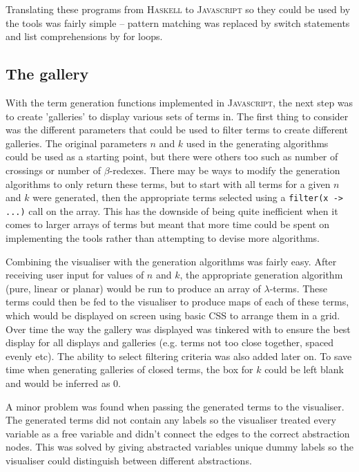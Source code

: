 \documentclass[11pt]{article}
\begin{document}
Translating these programs from \textsc{Haskell} to \textsc{Javascript} so they could be used by the tools was fairly simple -- pattern matching was replaced by switch statements and list comprehensions by for loops.

\subsection{The gallery}
With the term generation functions implemented in \textsc{Javascript}, the next step was to create 'galleries' to display various sets of terms in. The first thing to consider was the different parameters that could be used to filter terms to create different galleries. The original parameters $n$ and $k$ used in the generating algorithms could be used as a starting point, but there were others too such as number of crossings or number of $\beta$-redexes. There may be ways to modify the generation algorithms to only return these terms, but to start with all terms for a given $n$ and $k$ were generated, then the appropriate terms selected using a \texttt{filter(x -> ...)} call on the array. This has the downside of being quite inefficient when it comes to larger arrays of terms but meant that more time could be spent on implementing the tools rather than attempting to devise more algorithms.

Combining the visualiser with the generation algorithms was fairly easy. After receiving user input for values of $n$ and $k$, the appropriate generation algorithm (pure, linear or planar) would be run to produce an array of $\lambda$-terms. These terms could then be fed to the visualiser to produce maps of each of these terms, which would be displayed on screen using basic CSS to arrange them in a grid. Over time the way the gallery was displayed was tinkered with to ensure the best display for all displays and galleries (e.g. terms not too close together, spaced evenly etc). The ability to select filtering criteria was also added later on. To save time when generating galleries of closed terms, the box for $k$ could be left blank and would be inferred as 0.

A minor problem was found when passing the generated terms to the visualiser. The generated terms did not contain any labels so the visualiser treated every variable as a free variable and didn't connect the edges to the correct abstraction nodes. This was solved by giving abstracted variables unique dummy labels so the visualiser could distinguish between different abstractions.
\end{document}

